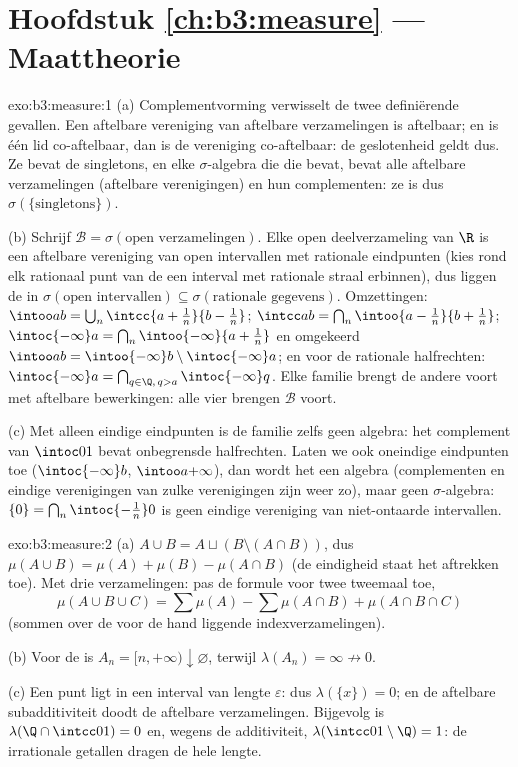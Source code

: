 \section*{Hoofdstuk \ref{ch:b3:measure} --- Maattheorie}

\begin{solution}{exo:b3:measure:1}
(a) Complementvorming verwisselt de twee definiërende gevallen.
Een aftelbare vereniging van aftelbare verzamelingen is
aftelbaar; en is één lid co-aftelbaar, dan is de vereniging
co-aftelbaar: de geslotenheid geldt dus. Ze bevat de singletons,
en elke $\sigma$-algebra die die bevat, bevat alle aftelbare
verzamelingen (aftelbare verenigingen) en hun complementen: ze is
dus $\sigma(\{\text{singletons}\})$.

(b) Schrijf $\mathcal B = \sigma(\text{open verzamelingen})$. Elke
open deelverzameling van $\R$ is een aftelbare vereniging van open
intervallen met rationale eindpunten (kies rond elk rationaal punt
van de  een interval met rationale straal
erbinnen), dus liggen de  in
$\sigma(\text{open intervallen}) \subseteq \sigma(\text{rationale
gegevens})$. Omzettingen: $\intoo ab = \bigcup_n\intcc{a +
\frac1n}{b - \frac1n}$; $\intcc ab = \bigcap_n \intoo{a -
\frac1n}{b + \frac1n}$; $\intoc{-\infty}a = \bigcap_n
\intoo{-\infty}{a + \frac1n}$ en omgekeerd $\intoo ab =
\intoo{-\infty}b \setminus \intoc{-\infty}a$; en voor de
rationale halfrechten: $\intoc{-\infty}a = \bigcap_{q \in \Q,\, q
> a}\intoc{-\infty}q$. Elke familie brengt de andere voort met
aftelbare bewerkingen: alle vier brengen $\mathcal B$ voort.

(c) Met alleen eindige eindpunten is de familie zelfs geen
algebra: het complement van $\intoc01$ bevat onbegrensde
halfrechten. Laten we ook oneindige eindpunten toe
($\intoc{-\infty}b$, $\intoo a{+\infty}$), dan wordt het een
algebra (complementen en eindige verenigingen van zulke
verenigingen zijn weer zo), maar geen $\sigma$-algebra: $\{0\} =
\bigcap_n\intoc{-\frac1n}0$ is geen eindige vereniging van
niet-ontaarde intervallen.
\end{solution}

\begin{solution}{exo:b3:measure:2}
(a) $A \cup B = A \sqcup (B \setminus (A\cap B))$, dus $\mu(A\cup
B) = \mu(A) + \mu(B) - \mu(A\cap B)$ (de eindigheid staat het
aftrekken toe). Met drie verzamelingen: pas de formule voor twee
tweemaal toe,
\[
\mu(A\cup B\cup C) = \sum\mu(A) - \sum\mu(A\cap B) +
\mu(A\cap B\cap C)
\]
(sommen over de voor de hand liggende indexverzamelingen).

(b) Voor de  is $A_n = [n, +\infty) \downarrow
\varnothing$, terwijl $\lambda(A_n) = \infty \not\to 0$.

(c) Een punt ligt in een interval van lengte $\varepsilon$: dus
$\lambda(\{x\}) = 0$; en de aftelbare subadditiviteit doodt de
aftelbare verzamelingen. Bijgevolg is $\lambda(\Q \cap \intcc01) =
0$ en, wegens de additiviteit, $\lambda(\intcc01\setminus\Q) = 1$:
de irrationale getallen dragen de hele lengte.
\end{solution}

